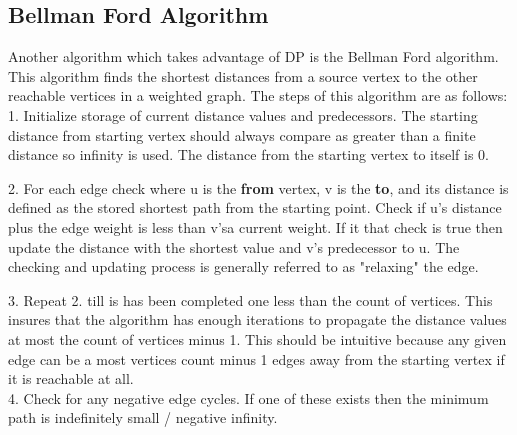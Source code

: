 \documentclass[letterpaper, 10pt]{article}
\begin{document}
\subsection{Bellman Ford Algorithm}
Another algorithm which takes advantage of DP is the Bellman Ford algorithm. This algorithm finds the shortest distances
from a source vertex to the other reachable vertices in a weighted graph. The steps of this algorithm are as follows:\\
1. Initialize storage of current distance values and predecessors. The starting distance from starting vertex
should always compare as greater than a finite distance so infinity is used. The distance from the starting vertex
to itself is 0.

2. For each edge check where u is the \textbf{from} vertex, v is the \textbf{to}, and its distance is defined
as the stored shortest path from the starting point. Check if u's distance plus the edge weight is less than v'sa
current weight. If it that check is true then update the distance with the shortest value and v's predecessor to u.
The checking and updating process is generally referred to as "relaxing" the edge.

3. Repeat 2. till is has been completed one less than the count of vertices. This insures that the algorithm has
enough iterations to propagate the distance values at most the count of vertices minus 1. This should be intuitive
because any given edge can be a most vertices count minus 1 edges away from the starting vertex if it is reachable at all.
\\
4. Check for any negative edge cycles. If one of these exists then the minimum path is indefinitely small / negative
infinity.

\end{document}
